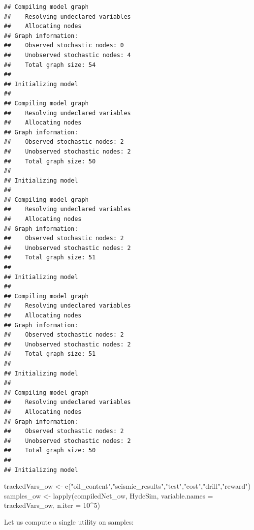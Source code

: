 \documentclass[
]{article}
\newenvironment{Shaded}{\begin{snugshade}}{\end{snugshade}}
\newcommand{\AttributeTok}[1]{\textcolor[rgb]{0.77,0.63,0.00}{#1}}
\newcommand{\ControlFlowTok}[1]{\textcolor[rgb]{0.13,0.29,0.53}{\textbf{#1}}}
\newcommand{\DecValTok}[1]{\textcolor[rgb]{0.00,0.00,0.81}{#1}}
\newcommand{\FunctionTok}[1]{\textcolor[rgb]{0.00,0.00,0.00}{#1}}
\newcommand{\NormalTok}[1]{#1}
\newcommand{\OtherTok}[1]{\textcolor[rgb]{0.56,0.35,0.01}{#1}}
\newcommand{\SpecialCharTok}[1]{\textcolor[rgb]{0.00,0.00,0.00}{#1}}
\newcommand{\StringTok}[1]{\textcolor[rgb]{0.31,0.60,0.02}{#1}}
\begin{document}
\begin{verbatim}
## Compiling model graph
##    Resolving undeclared variables
##    Allocating nodes
## Graph information:
##    Observed stochastic nodes: 0
##    Unobserved stochastic nodes: 4
##    Total graph size: 54
## 
## Initializing model
## 
## Compiling model graph
##    Resolving undeclared variables
##    Allocating nodes
## Graph information:
##    Observed stochastic nodes: 2
##    Unobserved stochastic nodes: 2
##    Total graph size: 50
## 
## Initializing model
## 
## Compiling model graph
##    Resolving undeclared variables
##    Allocating nodes
## Graph information:
##    Observed stochastic nodes: 2
##    Unobserved stochastic nodes: 2
##    Total graph size: 51
## 
## Initializing model
## 
## Compiling model graph
##    Resolving undeclared variables
##    Allocating nodes
## Graph information:
##    Observed stochastic nodes: 2
##    Unobserved stochastic nodes: 2
##    Total graph size: 51
## 
## Initializing model
## 
## Compiling model graph
##    Resolving undeclared variables
##    Allocating nodes
## Graph information:
##    Observed stochastic nodes: 2
##    Unobserved stochastic nodes: 2
##    Total graph size: 50
## 
## Initializing model
\end{verbatim}

\begin{Shaded}
\begin{Highlighting}[]
\NormalTok{trackedVars\_ow }\OtherTok{\textless{}{-}} \FunctionTok{c}\NormalTok{(}\StringTok{"oil\_content"}\NormalTok{,}\StringTok{"seismic\_results"}\NormalTok{,}\StringTok{"test"}\NormalTok{,}\StringTok{"cost"}\NormalTok{,}\StringTok{"drill"}\NormalTok{,}\StringTok{"reward"}\NormalTok{)}
\NormalTok{samples\_ow }\OtherTok{\textless{}{-}} \FunctionTok{lapply}\NormalTok{(compiledNet\_ow,}
\NormalTok{                     HydeSim,}
                     \AttributeTok{variable.names =}\NormalTok{ trackedVars\_ow,}
                     \AttributeTok{n.iter =} \DecValTok{10}\SpecialCharTok{\^{}}\DecValTok{5}\NormalTok{)}
\end{Highlighting}
\end{Shaded}

Let us compute a single utility on samples:

\begin{Shaded}
\end{Shaded}
\end{document}
